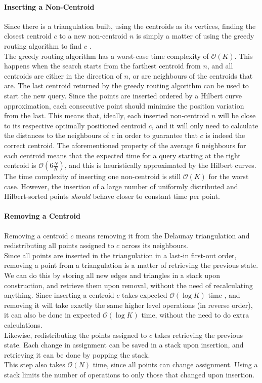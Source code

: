 \paragraph{Inserting a Non-Centroid}
Since there is a triangulation built, using the centroids as its vertices, finding the closest centroid $c$ to a new non-centroid $n$ is simply a matter of using the greedy routing algorithm to find $c$ \cite{greedyroute}.\\
The greedy routing algorithm has a worst-case time complexity of $\mathcal{O}(K)$. This happens when the search starts from the farthest centroid from $n$, and all centroids are either in the direction of $n$, or are neighbours of the centroids that are. 
The last centroid returned by the greedy routing algorithm can be used to start the new query. Since the points are inserted ordered by a Hilbert curve approximation, each consecutive point should minimise the position variation from the last.
This means that, ideally, each inserted non-centroid $n$ will be close to its respective optimally positioned centroid $c$, and it will only need to calculate the distances to the neighbours of $c$ in order to guarantee that $c$ is indeed the correct centroid.
The aforementioned property of the average 6 neighbours for each centroid means that the expected time for a query starting at the right centroid is $\mathcal{O}(6\frac{N}{K})$, and this is heuristically approximated by the Hilbert curves.\\
The time complexity of inserting one non-centroid is still $\mathcal{O}(K)$ for the worst case. However, the insertion of a large number of uniformly distributed and Hilbert-sorted points \emph{should} behave closer to constant time per point.

\paragraph{Removing a Centroid}
Removing a centroid $c$ means removing it from the Delaunay triangulation and redistributing all points assigned to $c$ across its neighbours.\\
Since all points are inserted in the triangulation in a last-in first-out order, removing a point from a triangulation is a matter of retrieving the previous state. We can do this by storing all new edges and triangles in a stack upon construction, and retrieve them upon removal, without the need of recalculating anything. Since inserting a centroid $c$ takes expected $\mathcal{O}(\log{K})$ time \cite{tricomplex}, and removing it will take exactly the same higher level operations (in reverse order), it can also be done in expected $\mathcal{O}(\log{K})$ time, without the need to do extra calculations.\\
Likewise, redistributing the points assigned to $c$ takes retrieving the previous state. Each change in assignment can be saved in a stack upon insertion, and retrieving it can be done by popping the stack.\\
This step also takes $\mathcal{O}(N)$ time, since all points can change assignment. Using a stack limits the number of operations to only those that changed upon insertion.

